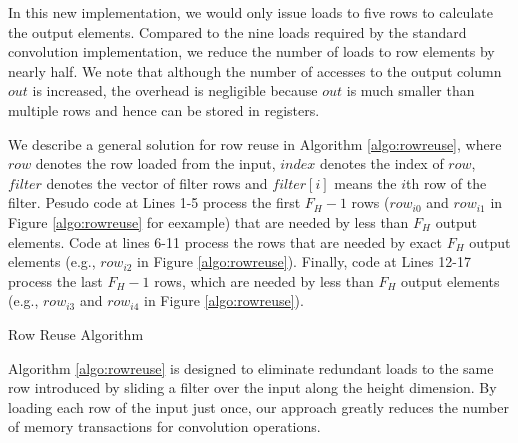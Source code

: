 In this new implementation, we would only issue loads to five rows to calculate the output elements. Compared to the nine loads required by
the standard convolution implementation, we reduce the number of loads to row elements by nearly half.  We note that although the number of
accesses to the output column $out$ is increased, the overhead is negligible because $out$ is much smaller than multiple rows and hence can
be stored in registers.

We describe a general solution for row reuse in Algorithm \ref{algo:rowreuse}, where $row$ denotes the row loaded from the input, $index$
denotes the index of $row$, $filter$ denotes the vector of filter rows and $filter[i]$ means the $i$th row of the filter. Pesudo code at
Lines 1-5 process the first $F_H-1$ rows ($row_{i0}$ and $row_{i1}$ in Figure \ref{algo:rowreuse} for eexample) that are needed by less
than $F_H$ output elements. Code at lines 6-11 process the rows that are needed by exact $F_H$ output elements (e.g., $row_{i2}$ in Figure
\ref{algo:rowreuse}). Finally, code at Lines 12-17 process the last $F_H-1$ rows, which are needed by less than $F_H$ output elements
(e.g., $row_{i3}$ and $row_{i4}$ in Figure \ref{algo:rowreuse}).


\begin{algorithm}[t!]
	\caption{Row Reuse Algorithm}
	\label{algo:rowreuse}
\end{algorithm}

Algorithm \ref{algo:rowreuse} is designed to eliminate redundant loads to the same row introduced by sliding a filter over the input along
the height dimension. By loading each row of the input just once, our approach greatly reduces the number of memory transactions for
convolution operations.

